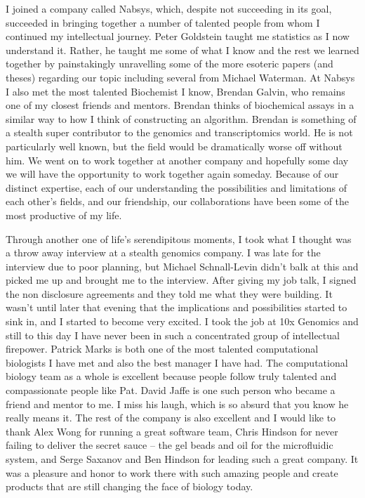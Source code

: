 \begin{acknowledgements}
I joined a company called Nabsys, which, despite not succeeding in its goal, succeeded in bringing together a number of talented people from whom I continued my intellectual journey. Peter Goldstein taught me statistics as I now understand it. Rather, he taught me some of what I know and the rest we learned together by painstakingly unravelling some of the more esoteric papers (and theses) regarding our topic including several from Michael Waterman. At Nabsys I also met the most talented Biochemist I know, Brendan Galvin, who remains one of my closest friends and mentors. Brendan thinks of biochemical assays in a similar way to how I think of constructing an algorithm. Brendan is something of a stealth super contributor to the genomics and transcriptomics world. He is not particularly well known, but the field would be dramatically worse off without him. We went on to work together at another company and hopefully some day we will have the opportunity to work together again someday. Because of our distinct expertise, each of our understanding the possibilities and limitations of each other's fields, and our friendship, our collaborations have been some of the most productive of my life. 

Through another one of life's serendipitous moments, I took what I thought was a throw away interview at a stealth genomics company. I was late for the interview due to poor planning, but Michael Schnall-Levin didn't balk at this and picked me up and brought me to the interview. After giving my job talk, I signed the non disclosure agreements and they told me what they were building. It wasn't until later that evening that the implications and possibilities started to sink in, and I started to become very excited. I took the job at 10x Genomics and still to this day I have never been in such a concentrated group of intellectual firepower. Patrick Marks is both one of the most talented computational biologists I have met and also the best manager I have had. The computational biology team as a whole is excellent because people follow truly talented and compassionate people like Pat. David Jaffe is one such person who became a friend and mentor to me. I miss his laugh, which is so absurd that you know he really means it. The rest of the company is also excellent and I would like to thank Alex Wong for running a great software team, Chris Hindson for never failing to deliver the secret sauce -- the gel beads and oil for the microfluidic system, and Serge Saxanov and Ben Hindson for leading such a great company. It was a pleasure and honor to work there with such amazing people and create products that are still changing the face of biology today. 


\end{acknowledgements}
